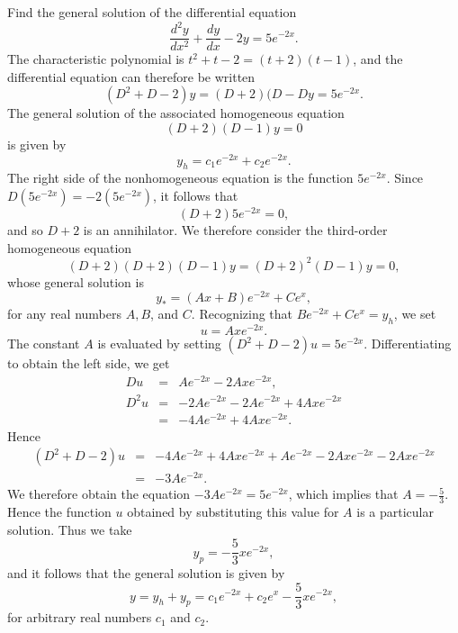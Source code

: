 \begin{example} Find the general solution of the differential equation
$$
\frac{d^2y}{dx^2} + \frac{dy}{dx} - 2y = 5e^{-2x}.
$$
The characteristic polynomial is $t^2 + t - 2 = (t + 2)(t - 1)$, and the differential equation can therefore be written
$$
(D^2 + D - 2)y = (D + 2)(D - Dy = 5e^{-2x}.
$$
The general solution of the associated homogeneous equation
$$
(D + 2)(D - 1)y = 0 
$$
is given by
$$
y_h = c_1e^{-2x} + c_2e^{-2x} .
$$
The right side of the nonhomogeneous equation is the function $5e^{-2x}$. Since $D(5e^{-2x}) = - 2(5e^{-2x})$, it follows that
$$
(D + 2)5e^{-2x} = 0 ,
$$
and so $D + 2$ is an annihilator. We therefore consider the third-order homogeneous equation
$$
(D + 2)(D + 2)(D - 1)y = (D + 2)^2(D - 1)y = 0, 
$$
whose general solution is
$$
y_* = (Ax + B)e^{-2x} + Ce^{x}, 
$$
for any real numbers $A, B$, and $C$. Recognizing that $Be^{-2x} + Ce^x = y_h$, we set 
$$
u = Axe^{-2x}.
$$
The constant $A$ is evaluated by setting $(D^2 + D - 2)u = 5e^{-2x}$. Differentiating to obtain the left side, we get
\begin{eqnarray*}
    Du &=& Ae^{-2x} - 2Axe^{-2x},\\
D^2u &=& - 2Ae^{-2x} - 2Ae^{-2x} + 4Axe^{-2x}\\
          &=& - 4Ae^{-2x} + 4Axe^{-2x}. 
\end{eqnarray*}
Hence
\begin{eqnarray*}
(D^2 + D - 2)u &=& - 4Ae^{-2x} + 4Axe^{-2x} + Ae^{-2x} - 2Axe^{-2x} - 2Axe^{-2x}\\
                       &=& - 3Ae^{-2x} .
\end{eqnarray*}
We therefore obtain the equation $-3Ae^{-2x} = 5e^{-2x}$, which implies that $A = - \frac{5}{3}$. Hence the function $u$ obtained by substituting this value for $A$ is a particular solution. Thus we take
$$
y_p = - \frac{5}{3} xe^{-2x},
$$
and it follows that the general solution is given by
$$
y = y_h + y_p = c_1e^{-2x} + c_2e^{x} - \frac{5}{3}xe^{-2x}, 
$$
for arbitrary real numbers $c_1$ and $c_2$.
\end{example}

